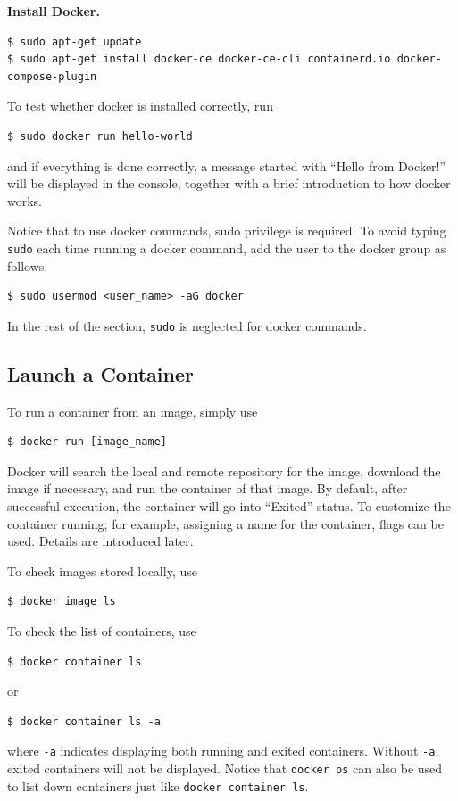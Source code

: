 \vspace{0.1in}
\noindent \textbf{Install Docker.}
\begin{lstlisting}
$ sudo apt-get update
$ sudo apt-get install docker-ce docker-ce-cli containerd.io docker-compose-plugin
\end{lstlisting}

To test whether docker is installed correctly, run
\begin{lstlisting}
$ sudo docker run hello-world
\end{lstlisting}
and if everything is done correctly, a message started with ``Hello from Docker!'' will be displayed in the console, together with a brief introduction to how docker works.

Notice that to use docker commands, sudo privilege is required. To avoid typing \verb|sudo| each time running a docker command, add the user to the docker group as follows.
\begin{lstlisting}
$ sudo usermod <user_name> -aG docker
\end{lstlisting}

In the rest of the section, \verb|sudo| is neglected for docker commands.

\subsection{Launch a Container}

To run a container from an image, simply use
\begin{lstlisting}
$ docker run [image_name]
\end{lstlisting}
Docker will search the local and remote repository for the image, download the image if necessary, and run the container of that image. By default, after successful execution, the container will go into ``Exited'' status. To customize the container running, for example, assigning a name for the container, flags can be used. Details are introduced later.

To check images stored locally, use
\begin{lstlisting}
$ docker image ls
\end{lstlisting}

To check the list of containers, use
\begin{lstlisting}
$ docker container ls
\end{lstlisting}
or
\begin{lstlisting}
$ docker container ls -a
\end{lstlisting}
where \verb|-a| indicates displaying both running and exited containers. Without \verb|-a|, exited containers will not be displayed. Notice that \verb|docker ps| can also be used to list down containers just like \verb|docker container ls|.

